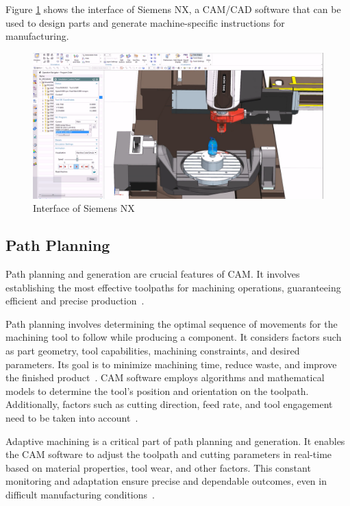 
Figure \ref{CAMinterface} shows the interface of Siemens NX, a \acrshort{CAM}/\acrshort{CAD} software that can be used to design parts and generate machine-specific instructions for manufacturing. 

\begin{figure}[H]
	\centerline{\includegraphics[scale=.4]{figures/CAM.png}}
	\caption{Interface of Siemens NX~\cite{NXManufacturing.2015}}
	\label{CAMinterface}
\end{figure}


\subsection{Path Planning}\label{papla}
Path planning and generation are crucial features of \acrshort{CAM}. It involves establishing the most effective toolpaths for machining operations, guaranteeing efficient and precise production~\cite{Brecher.2013}.

Path planning involves determining the optimal sequence of movements for the machining tool to follow while producing a component. It considers factors such as part geometry, tool capabilities, machining constraints, and desired parameters. Its goal is to minimize machining time, reduce waste, and improve the finished product~\cite{Xu.2015}. \acrshort{CAM} software employs algorithms and mathematical models to determine the tool's position and orientation on the toolpath. Additionally, factors such as cutting direction, feed rate, and tool engagement need to be taken into account~\cite{Tunc.2017}.

Adaptive machining is a critical part of path planning and generation. It enables the \acrshort{CAM} software to adjust the toolpath and cutting parameters in real-time based on material properties, tool wear, and other factors. This constant monitoring and adaptation ensure precise and dependable outcomes, even in difficult manufacturing conditions~\cite{Liu.2017}.

